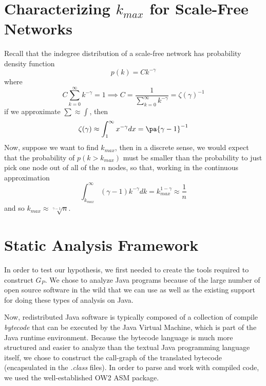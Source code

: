 \documentclass[11pt,a4paper]{article}
\begin{document}
\section*{Characterizing $k_{max}$ for Scale-Free Networks}
Recall that the indegree distribution of a scale-free network has probability 
density function
$$
p(k) = C k^{-\gamma}
$$
where 
$$
C \sum_{k=0}^\infty k^{-\gamma} = 1 \implies 
C = \frac{1}{\sum\limits_{k=0}^\infty k^{-\gamma}} = \zeta(\gamma)^{-1}
$$
if we approximate $\sum \approx \int$, then
$$
\zeta(\gamma) \approx \int_1^\infty x^{-\gamma} dx = \pa{\gamma-1}^{-1}
$$
Now, suppose we want to find $k_{max}$, then in a discrete sense, we would 
expect that the probability of $p(k > k_{max})$ must be smaller than the 
probability to just pick one node out of all of the $n$ nodes, so that, 
working in the continuous approximation
$$
\int_{k_{max}}^\infty (\gamma -1)k^{-\gamma} dk = k_{max}^{1-\gamma} \approx 
\frac{1}{n}
$$
and so $k_{max} \approx \sqrt[\gamma - 1]{n}$. \cite{CLASS}

\section*{Static Analysis Framework}
In order to test our hypothesis, we first needed to create the tools required 
to construct $G_P$. We chose to analyze Java programs because of the large 
number of open source software in the wild that we can use as well as the 
existing support for doing these types of analysis on Java. 

Now, redistributed Java software is typically composed of a collection of 
compile \emph{bytecode} that can be executed by the Java Virtual Machine, 
which is part of the Java runtime environment. Because the bytecode language 
is much more structured and easier to analyze than the textual Java 
programming language itself, we chose to construct the call-graph of the 
translated bytecode (encapsulated in the \emph{.class} files). In order to 
parse and work with compiled code, we used the well-established OW2 ASM 
package. \cite{ocwasm} 
\end{document}
